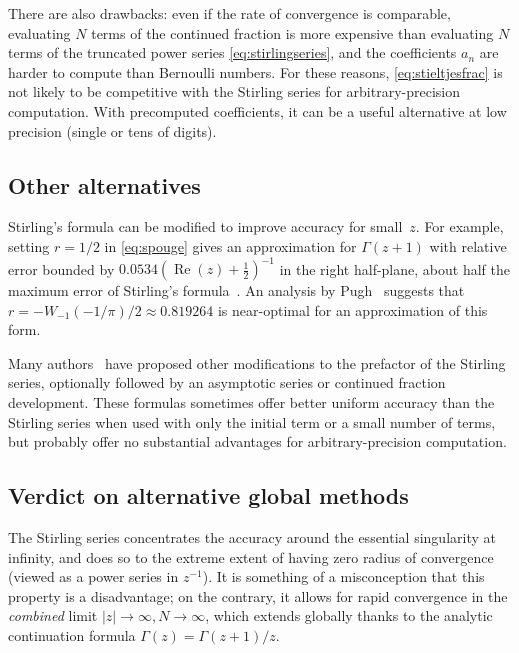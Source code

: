 \documentclass[reqno]{amsart}
\theoremstyle{definition}
\begin{document}
There are also drawbacks: even if the rate of convergence is comparable, evaluating $N$ terms of the
continued fraction is more expensive than evaluating
$N$ terms of the truncated power series \eqref{eq:stirlingseries},
and the coefficients $a_n$ are harder to compute than Bernoulli numbers.
For these reasons, \eqref{eq:stieltjesfrac} is not likely to be competitive with
the Stirling series for
arbitrary-precision computation.
With precomputed coefficients, it can be a useful alternative
at low precision (single or tens of digits).

\subsection{Other alternatives}

Stirling's formula
can be modified to improve accuracy for small~$z$.
For example, setting $r = 1/2$ in
\eqref{eq:spouge}
gives an approximation for $\Gamma(z+1)$ with relative error bounded by
$0.0534 (\operatorname{Re}(z) + \tfrac{1}{2})^{-1}$ in the right half-plane,
about half the maximum error of Stirling's formula~\cite[Theorem~1.3.2]{Spouge1994}.
An analysis by Pugh~\cite{pugh2004analysis} suggests that
$r = -W_{-1}(-1/\pi)/2 \approx 0.819264$ is near-optimal for
an approximation of this form.

Many authors~\cite{Nemes2010,Mortici2014,Chen2016,Wang2016,luschny2016,morris2020tweaking}
have proposed other modifications to the prefactor of the
Stirling series,
optionally followed by an asymptotic series
or continued fraction development.
These formulas sometimes offer better uniform accuracy than the Stirling series
when used with only the initial term or a small number of terms,
but probably offer no substantial advantages for arbitrary-precision computation.

\subsection{Verdict on alternative global methods}

The Stirling series
concentrates the accuracy around the
essential singularity at infinity,
and does so to the extreme extent of having zero radius of convergence
(viewed as a power series in $z^{-1}$).
It is something of a misconception that this property is a disadvantage;
on the contrary, it allows for rapid convergence in the
\emph{combined} limit $|z| \to \infty, N \to \infty$,
which extends globally thanks to the analytic continuation formula $\Gamma(z) = \Gamma(z+1) / z$.
\end{document}
